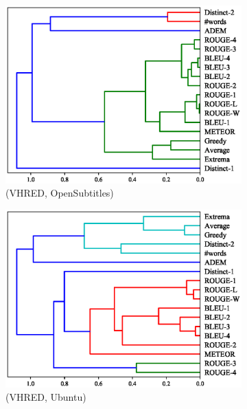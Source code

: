 \begin{figure}[htb]
\begin{subfigure}{0.40\linewidth}
        \includegraphics[width=\linewidth]{figure/plot/hierarchy/v2/pearson/vhred/opensub/plot.eps}
        \caption{(VHRED, OpenSubtitles)}
    \end{subfigure}%
    \begin{subfigure}{0.40\linewidth}
        \centering
        \includegraphics[width=\linewidth]{figure/plot/hierarchy/v2/pearson/vhred/ubuntu/plot.eps}
        \caption{(VHRED, Ubuntu)}
    \end{subfigure}
    \begin{subfigure}{0.40\linewidth}
        \centering

\end{subfigure}
\end{figure}
